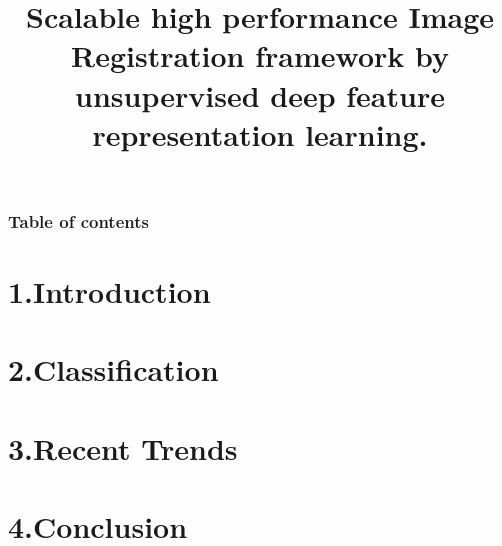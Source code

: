 \documentclass{beamer}
\title[Medical Image Registration]{Scalable high performance Image Registration framework by unsupervised deep feature representation learning.}
\author{} %
\institute[IIIT Vadodara] %
{
	\section{\vspace{-10ex}}
	\medskip
	\textbf{Presented By -} \\ %
	
	\text{Vijay Deshpande (201761003)}
	

}
\begin{document}
\begin{frame}
\titlepage %
\end{frame}

\begin{frame}
\frametitle{Table of contents} %
\tableofcontents %



\section{1.Introduction} 
\section{2.Classification}
\section{3.Recent Trends}
\section{4.Conclusion}
\end{frame}
\end{document}
